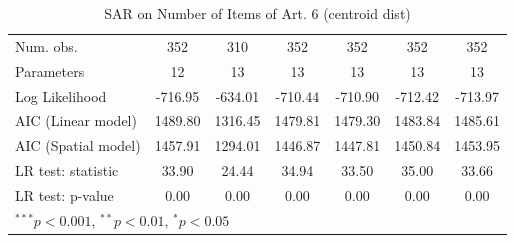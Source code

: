 \begin{table}[!h]
\begin{center}
\begin{tabular}{l c c c c c c }
\midrule
Num. obs.               & 352          & 310          & 352          & 352          & 352          & 352          \\
Parameters              & 12           & 13           & 13           & 13           & 13           & 13           \\
Log Likelihood          & -716.95      & -634.01      & -710.44      & -710.90      & -712.42      & -713.97      \\
AIC (Linear model)      & 1489.80      & 1316.45      & 1479.81      & 1479.30      & 1483.84      & 1485.61      \\
AIC (Spatial model)     & 1457.91      & 1294.01      & 1446.87      & 1447.81      & 1450.84      & 1453.95      \\
LR test: statistic      & 33.90        & 24.44        & 34.94        & 33.50        & 35.00        & 33.66        \\
LR test: p-value        & 0.00         & 0.00         & 0.00         & 0.00         & 0.00         & 0.00         \\
\bottomrule
\multicolumn{7}{l}{\scriptsize{$^{***}p<0.001$, $^{**}p<0.01$, $^*p<0.05$}}
\end{tabular}
\caption{SAR on Number of Items of Art. 6 (centroid dist)}
\label{table:coefficients}
\end{center}
\end{table}
